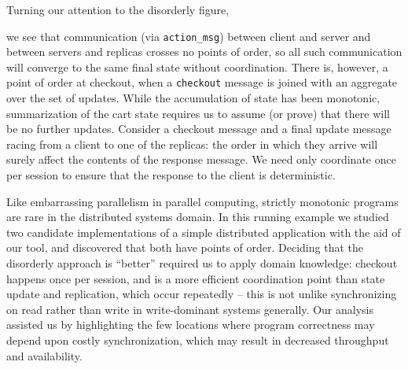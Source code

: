 Turning our attention to the disorderly figure,

we see that communication (via \texttt{action\_msg}) between client and server
and between servers and replicas crosses no points of order, so all such
communication will converge to the same final state without coordination.
There is, however, a point of order at checkout, when a \texttt{checkout}
message is joined with an aggregate over the set of updates.  While the 
accumulation of state has been monotonic, summarization of the cart state
requires us to assume (or prove) that there will be no further updates.
Consider a checkout message and a final update message racing from a client
to one of the replicas: the order in which they arrive will surely affect
the contents of the response message.  
We need only coordinate once per session to
ensure that the response to the client is deterministic.

Like embarrassing parallelism in parallel computing, strictly monotonic programs
are rare in the distributed systems domain.  In this running example we studied
two candidate implementations of a simple distributed application with the aid of
our tool, and discovered that both have points of order.  Deciding that the disorderly
approach is ``better'' required us to apply domain knowledge: checkout happens
once per session, and is a more efficient coordination point than state update and replication, 
which occur repeatedly -- this is not unlike synchronizing on read rather than write 
in write-dominant systems generally.  Our analysis assisted us by highlighting the few locations where program correctness may depend upon costly synchronization, which may
result in decreased throughput and availability.  


